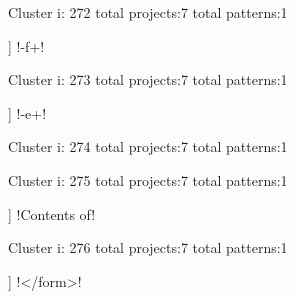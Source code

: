 Cluster i: 272
total projects:7
total patterns:1
\begin{multicols}{1}
\begin{description}[noitemsep,topsep=0pt]
\item [[7] ] \cverb!\s*-f\s+!
\end{description}
\end{multicols}







Cluster i: 273
total projects:7
total patterns:1
\begin{multicols}{1}
\begin{description}[noitemsep,topsep=0pt]
\item [[7] ] \cverb!\s*-e\s+!
\end{description}
\end{multicols}







Cluster i: 274
total projects:7
total patterns:1
\begin{multicols}{1}
\begin{description}[noitemsep,topsep=0pt]
\item [[7] ] \cverb!^[sgydpn]+$!
\end{description}
\end{multicols}







Cluster i: 275
total projects:7
total patterns:1
\begin{multicols}{1}
\begin{description}[noitemsep,topsep=0pt]
\item [[7] ] \cverb!Contents of!
\end{description}
\end{multicols}







Cluster i: 276
total projects:7
total patterns:1
\begin{multicols}{1}
\begin{description}[noitemsep,topsep=0pt]
\item [[7] ] \cverb!</form\s*>!
\end{description}
\end{multicols}







